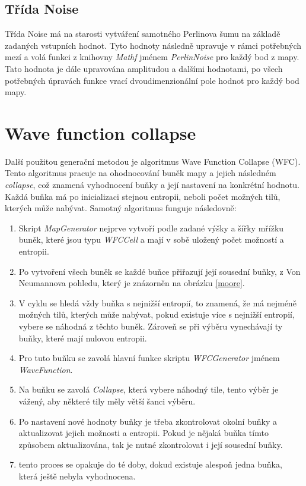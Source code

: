 \subsection{Třída Noise}
\label{noiseClass}
Třída Noise má na starosti vytváření samotného Perlinova šumu na základě zadaných vstupních hodnot. Tyto hodnoty následně upravuje v rámci potřebných mezí a volá funkci z knihovny \textit{Mathf} jménem \textit{PerlinNoise} pro každý bod z mapy. Tato hodnota je dále upravována amplitudou a dalšími hodnotami, po všech potřebných úpravách funkce vrací dvoudimenzionální pole hodnot pro každý bod mapy.

\section{Wave function collapse}
\label{WFCImplement}
Další použitou generační metodou je algoritmus Wave Function Collapse (WFC). Tento algoritmus pracuje na ohodnocování buněk mapy a jejich následném \textit{collapse}, což znamená vyhodnocení buňky a její nastavení na konkrétní hodnotu. Každá buňka má po inicializaci stejnou entropii, neboli počet možných tilů, kterých může nabývat. Samotný algoritmus funguje následovně:

\begin{enumerate}
	\item Skript \textit{MapGenerator} nejprve vytvoří podle zadané výšky a šířky mřížku buněk, které jsou typu \textit{WFCCell} a mají v sobě uložený počet možností a entropii.
	\item Po vytvoření všech buněk se každé buňce přiřazují její sousední buňky, z Von Neumannova pohledu, který je znázorněn na obrázku \ref{moore}.
	\item V cyklu se hledá vždy buňka s nejnižší entropií, to znamená, že má nejméně možných tilů, kterých může nabývat, pokud existuje více s nejnižší entropií, vybere se náhodná z těchto buněk. Zároveň se při výběru vynechávají ty buňky, které mají nulovou entropii.
	\item Pro tuto buňku se zavolá hlavní funkce skriptu \textit{WFCGenerator} jménem \textit{WaveFunction}. 
	\item Na buňku se zavolá \textit{Collapse}, která vybere náhodný tile, tento výběr je vážený, aby některé tily měly větší šanci výběru.
	\item Po nastavení nové hodnoty buňky je třeba zkontrolovat okolní buňky a aktualizovat jejich možnosti a entropii. Pokud je nějaká buňka tímto způsobem aktualizována, tak je nutné zkontrolovat i její sousední buňky.
	\item tento proces se opakuje do té doby, dokud existuje alespoň jedna buňka, která ještě nebyla vyhodnocena.
\end{enumerate}

